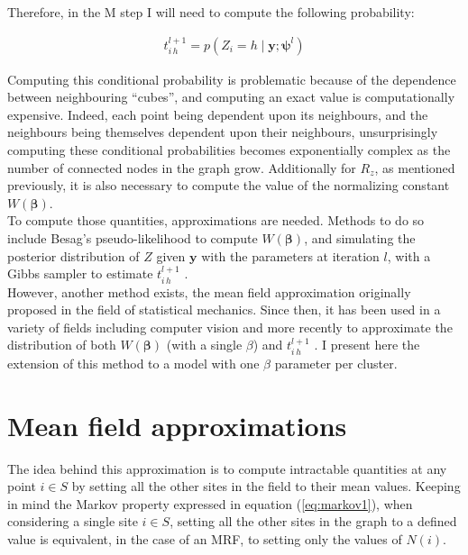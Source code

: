 Therefore, in the M step I will need to compute the following probability:

\begin{align*}
t_{i\,h}^{l+1} = p(Z_i = h \mid \boldsymbol{y};\boldsymbol{\psi}^{l})
\end{align*}

Computing this conditional probability is problematic because of the dependence between neighbouring ``cubes'', and computing an exact value is computationally expensive. Indeed, each point being dependent upon its neighbours, and the neighbours being themselves dependent upon their neighbours, unsurprisingly computing these conditional probabilities becomes exponentially complex as the number of connected nodes in the graph grow. Additionally for $R_z$, as mentioned previously, it is also necessary to compute the value of the normalizing constant $W(\boldsymbol{\beta})$.\\

To compute those quantities, approximations are needed. Methods to do so include Besag's pseudo-likelihood \cite{Besag75} to compute $W(\boldsymbol{\beta})$, and simulating the posterior distribution of $Z$ given $\boldsymbol{y}$ with the parameters at iteration $l$, with a Gibbs sampler to estimate $t_{i\,h}^{l+1}$ \cite{Chalmond89}.\\

However, another method exists, the mean field approximation originally proposed in the field of statistical mechanics. Since then, it has been used in a variety of fields including computer vision \cite{Yuille90} and more recently to approximate the distribution of both $W(\boldsymbol{\beta})$ (with a single $\beta$) and $t_{i\,h}^{l+1}$ \cite{Zhang92}. I present here the extension of this method to a model with one $\beta$ parameter per cluster.

\section{Mean field approximations}

The idea behind this approximation is to compute intractable quantities at any point $i \in S$ by setting all the other sites in the field to their mean values. Keeping in mind the Markov property expressed in equation (\ref{eq:markov1}), when considering a single site $i \in S$, setting all the other sites in the graph to a defined value is equivalent, in the case of an MRF, to setting only the values of $N(i)$.\\

